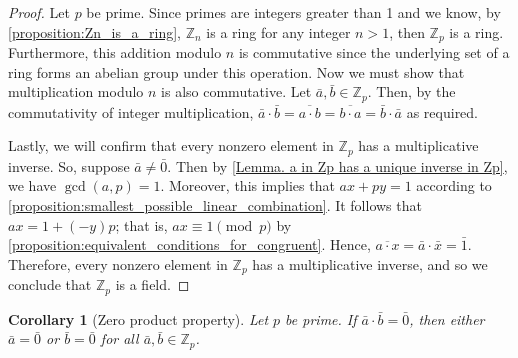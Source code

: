 \documentclass[12pt, titlepage]{amsart}
\newcommand\Z{{\mathbb Z}}
\newtheorem{cor}{Corollary}[subsection]
\theoremstyle{definition}
\begin{document}
	\begin{proof}
		Let $p$ be prime.
		Since primes are integers greater than 1 and we know, by \cref{proposition:Zn_is_a_ring}, $\Z_n$ is a ring for any integer $n > 1$, then $\Z_p$ is a ring.
		Furthermore, this addition modulo $n$ is commutative since the underlying set of a ring forms an abelian group under this operation.
		Now we must show that multiplication modulo $n$ is also commutative.
		Let $\bar{a}, \bar{b} \in \Z_p$.
		Then, by the commutativity of integer multiplication, $\bar{a} \cdot \bar{b} = \overline{a \cdot b} = \overline{b \cdot a} = \bar{b} \cdot \bar{a}$ as required.
		
		Lastly, we will confirm that every nonzero element in $\Z_p$ has a multiplicative inverse.
		So, suppose $\bar{a} \neq \bar{0}$.
		Then by \cref{Lemma. a in Zp has a unique inverse in Zp}, we have $\gcd(a,p)=1$.
		Moreover, this implies that $ax + py = 1$ according to \cref{proposition:smallest_possible_linear_combination}.
		It follows that $ax = 1 + (-y)p$; that is, $ax \equiv 1 \pmod p$ by \cref{proposition:equivalent_conditions_for_congruent}.
		Hence, $\overline{a \cdot x} = \bar{a} \cdot \bar{x} = \bar{1}$.
		Therefore, every nonzero element in $\Z_p$ has a multiplicative inverse, and so we conclude that $\Z_p$ is a field. 
	\end{proof}
	
	\begin{cor}[Zero product property]\label{corollary:zero_product_property}
		Let $p$ be prime. If $\bar{a} \cdot \bar{b} = \bar{0}$, then either $\bar{a} = \bar{0}$ or $\bar{b} = \bar{0}$ for all $\bar{a}, \bar{b} \in \Z_p$.
	\end{cor}
\end{document}
